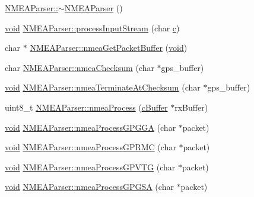 \begin{DoxyCompactItemize}
\item 
\hyperlink{group___g_p_s_gadget_plugin_gaedf659d241eff03757c31f3b80697f89}{N\-M\-E\-A\-Parser\-::$\sim$\-N\-M\-E\-A\-Parser} ()
\item 
\hyperlink{group___u_a_v_objects_plugin_ga444cf2ff3f0ecbe028adce838d373f5c}{void} \hyperlink{group___g_p_s_gadget_plugin_gaf4983b5649be1ec2deb7dafcd4a3573c}{N\-M\-E\-A\-Parser\-::process\-Input\-Stream} (char \hyperlink{glext_8h_a1f2d7f8147412c43ba2303a56f97ee73}{c})
\item 
char $\ast$ \hyperlink{group___g_p_s_gadget_plugin_ga5c79371e20badd15d23705c63eaacfe1}{N\-M\-E\-A\-Parser\-::nmea\-Get\-Packet\-Buffer} (\hyperlink{group___u_a_v_objects_plugin_ga444cf2ff3f0ecbe028adce838d373f5c}{void})
\item 
char \hyperlink{group___g_p_s_gadget_plugin_gaba9a601d8ec049e7f398b5d42cd974a1}{N\-M\-E\-A\-Parser\-::nmea\-Checksum} (char $\ast$gps\-\_\-buffer)
\item 
\hyperlink{group___u_a_v_objects_plugin_ga444cf2ff3f0ecbe028adce838d373f5c}{void} \hyperlink{group___g_p_s_gadget_plugin_gab0b239f615ef146897cec5c020735a8e}{N\-M\-E\-A\-Parser\-::nmea\-Terminate\-At\-Checksum} (char $\ast$gps\-\_\-buffer)
\item 
uint8\-\_\-t \hyperlink{group___g_p_s_gadget_plugin_ga55718bf48b8a95492b1aa43a65490e64}{N\-M\-E\-A\-Parser\-::nmea\-Process} (\hyperlink{group__buffer_ga63b2a19263ed371e329776b34f3164eb}{c\-Buffer} $\ast$rx\-Buffer)
\item 
\hyperlink{group___u_a_v_objects_plugin_ga444cf2ff3f0ecbe028adce838d373f5c}{void} \hyperlink{group___g_p_s_gadget_plugin_ga0ac80dbcc0ad8bec03f026c3feb2c097}{N\-M\-E\-A\-Parser\-::nmea\-Process\-G\-P\-G\-G\-A} (char $\ast$packet)
\item 
\hyperlink{group___u_a_v_objects_plugin_ga444cf2ff3f0ecbe028adce838d373f5c}{void} \hyperlink{group___g_p_s_gadget_plugin_ga838f8b6c0bea66c17f82fec788a1a74f}{N\-M\-E\-A\-Parser\-::nmea\-Process\-G\-P\-R\-M\-C} (char $\ast$packet)
\item 
\hyperlink{group___u_a_v_objects_plugin_ga444cf2ff3f0ecbe028adce838d373f5c}{void} \hyperlink{group___g_p_s_gadget_plugin_ga10893234aff922433723153e6057386e}{N\-M\-E\-A\-Parser\-::nmea\-Process\-G\-P\-V\-T\-G} (char $\ast$packet)
\item 
\hyperlink{group___u_a_v_objects_plugin_ga444cf2ff3f0ecbe028adce838d373f5c}{void} \hyperlink{group___g_p_s_gadget_plugin_gad10ce6b495849dd4cf6e019d650a87f7}{N\-M\-E\-A\-Parser\-::nmea\-Process\-G\-P\-G\-S\-A} (char $\ast$packet)

\end{DoxyCompactItemize}
